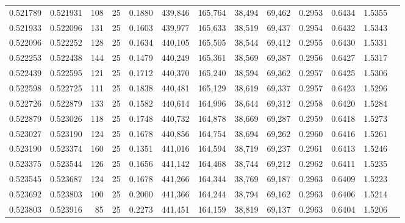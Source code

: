\begin{tabular}{rrrrrrrrrrrrr}
0.521789 & 0.521931 &   108 &  25 &                                     0.1880 & 439,846 & 165,764 &  38,494 &  69,462 & 0.2953 & 0.6434 & 1.5355 \\
0.521933 & 0.522096 &   131 &  25 &                                     0.1603 & 439,977 & 165,633 &  38,519 &  69,437 & 0.2954 & 0.6432 & 1.5343 \\
0.522096 & 0.522252 &   128 &  25 &                                     0.1634 & 440,105 & 165,505 &  38,544 &  69,412 & 0.2955 & 0.6430 & 1.5331 \\
0.522253 & 0.522438 &   144 &  25 &                                     0.1479 & 440,249 & 165,361 &  38,569 &  69,387 & 0.2956 & 0.6427 & 1.5317 \\
0.522439 & 0.522595 &   121 &  25 &                                     0.1712 & 440,370 & 165,240 &  38,594 &  69,362 & 0.2957 & 0.6425 & 1.5306 \\
0.522598 & 0.522725 &   111 &  25 &                                     0.1838 & 440,481 & 165,129 &  38,619 &  69,337 & 0.2957 & 0.6423 & 1.5296 \\
0.522726 & 0.522879 &   133 &  25 &                                     0.1582 & 440,614 & 164,996 &  38,644 &  69,312 & 0.2958 & 0.6420 & 1.5284 \\
0.522879 & 0.523026 &   118 &  25 &                                     0.1748 & 440,732 & 164,878 &  38,669 &  69,287 & 0.2959 & 0.6418 & 1.5273 \\
0.523027 & 0.523190 &   124 &  25 &                                     0.1678 & 440,856 & 164,754 &  38,694 &  69,262 & 0.2960 & 0.6416 & 1.5261 \\
0.523190 & 0.523374 &   160 &  25 &                                     0.1351 & 441,016 & 164,594 &  38,719 &  69,237 & 0.2961 & 0.6413 & 1.5246 \\
0.523375 & 0.523544 &   126 &  25 &                                     0.1656 & 441,142 & 164,468 &  38,744 &  69,212 & 0.2962 & 0.6411 & 1.5235 \\
0.523545 & 0.523687 &   124 &  25 &                                     0.1678 & 441,266 & 164,344 &  38,769 &  69,187 & 0.2963 & 0.6409 & 1.5223 \\
0.523692 & 0.523803 &   100 &  25 &                                     0.2000 & 441,366 & 164,244 &  38,794 &  69,162 & 0.2963 & 0.6406 & 1.5214 \\
0.523803 & 0.523916 &    85 &  25 &                                     0.2273 & 441,451 & 164,159 &  38,819 &  69,137 & 0.2963 & 0.6404 & 1.5206 \\

\end{tabular}
